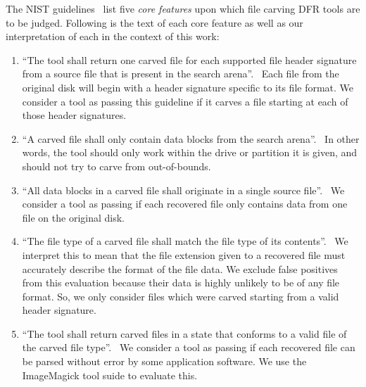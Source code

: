 \begin{paraphrase}
 The NIST guidelines~\cite{carving_standards} list five \emph{core features} upon which file carving DFR tools are to be judged.
Following is the text of each core feature as well as our interpretation of each in the context of this work:
\end{paraphrase}
\begin{enumerate}
 \item ``The tool shall return one carved file for each supported file header signature from a source file that is present in the search arena''.~\cite{carving_standards}
 Each file from the original disk will begin with a header signature specific to its file format. We consider a tool as passing this guideline if it carves a file starting at each of those header signatures.
 
 \item ``A carved file shall only contain data blocks from the search arena''.~\cite{carving_standards}
 In other words, the tool should only work within the drive or partition it is given, and should not try to carve from out-of-bounds.
 
 \item ``All data blocks in a carved file shall originate in a single source file''.~\cite{carving_standards}
We consider a tool as passing if each recovered file only contains data from one file on the original disk.
 
 \item ``The file type of a carved file shall match the file type of its contents''.~\cite{carving_standards}
 We interpret this to mean that the file extension given to a recovered file must accurately describe the format of the file data. We exclude false positives from this evaluation because their data is highly unlikely to be of any file format. So, we only consider files which were carved starting from a valid header signature.
 
 \item ``The tool shall return carved files in a state that conforms to a valid file of the carved file type''.~\cite{carving_standards}
 We consider a tool as passing if each recovered file can be parsed without error by some application software.
 We use the ImageMagick tool suide to evaluate this.
\end{enumerate} 
